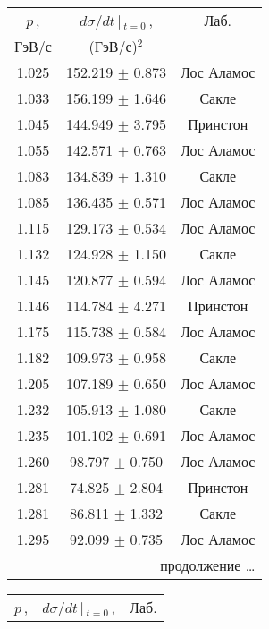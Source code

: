 \begin{table}[hp]
  \begin{center}
    \bigskip
    \resizebox{1.0\textwidth}{!} {
      \begin{tabular}{|c|c|c|}
        \hline $p$\,, & $d\sigma/dt\,|\,_{t=0}$\,, & Лаб. \\
        ГэВ/с & (ГэВ/с)$^2$ & \\ \hline \hline
        1.025 & 152.219 $\pm$ 0.873 & Лос Аламос \\ \hline
        1.033 & 156.199 $\pm$ 1.646 & Сакле \\ \hline
        1.045 & 144.949 $\pm$ 3.795 & Принстон \\ \hline
        1.055 & 142.571 $\pm$ 0.763 & Лос Аламос \\ \hline
        1.083 & 134.839 $\pm$ 1.310 & Сакле \\ \hline
        1.085 & 136.435 $\pm$ 0.571 & Лос Аламос \\ \hline
        1.115 & 129.173 $\pm$ 0.534 & Лос Аламос \\ \hline
        1.132 & 124.928 $\pm$ 1.150 & Сакле \\ \hline
        1.145 & 120.877 $\pm$ 0.594 & Лос Аламос \\ \hline
        1.146 & 114.784 $\pm$ 4.271 & Принстон \\ \hline
        1.175 & 115.738 $\pm$ 0.584 & Лос Аламос \\ \hline
        1.182 & 109.973 $\pm$ 0.958 & Сакле \\ \hline
        1.205 & 107.189 $\pm$ 0.650 & Лос Аламос \\ \hline
        1.232 & 105.913 $\pm$ 1.080 & Сакле \\ \hline
        1.235 & 101.102 $\pm$ 0.691 & Лос Аламос \\ \hline
        1.260 & 98.797 $\pm$ 0.750 & Лос Аламос \\ \hline
        1.281 & 74.825 $\pm$ 2.804 & Принстон \\ \hline
        1.281 & 86.811 $\pm$ 1.332 & Сакле \\ \hline
        1.295 & 92.099 $\pm$ 0.735 & Лос Аламос \\ \hline
        \multicolumn{3}{|r|}{{продолжение \dots}} \\ \hline
      \end{tabular}
      \quad
      \begin{tabular}{|c|c|c|}
        \hline $p$\,, & $d\sigma/dt\,|\,_{t=0}$\,, & Лаб. \\

\end{tabular}}
\end{center}
\end{table}
